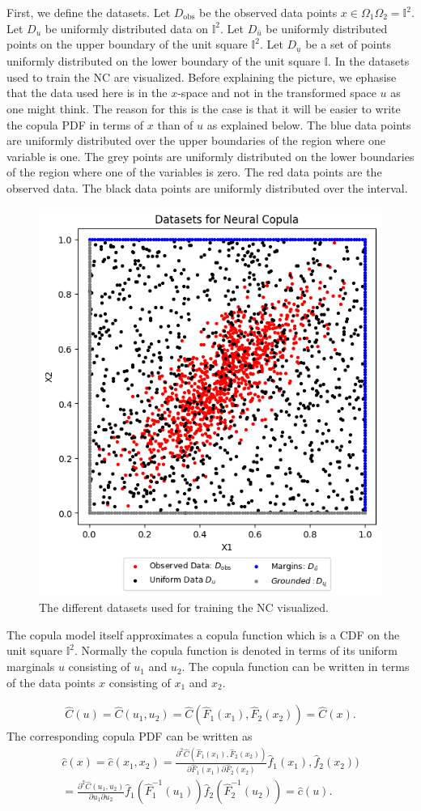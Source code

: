 First, we define the datasets. Let $D_{\mathrm{obs}}$ be the observed data points $x \in \Omega_1\Omega_2  = \mathbb{I}^2$. Let $D_{u}$ be uniformly distributed data on $\mathbb{I}^2$. Let $D_{\bar{u}}$ be uniformly distributed points on the upper boundary of the unit square $\mathbb{I}^2$. Let $D_{\underline{u}}$ be a set of points uniformly distributed on the lower boundary of the unit square $\mathbb{I}$. In  the datasets used to train the \gls{NC} are visualized. Before explaining the picture, we ephasise that the data used here is in the $x$-space and not in the transformed space $u$ as one might think. The reason for this is the case is that it will be easier to write the copula \gls{PDF} in terms of $x$ than of $u$ as explained below. The blue data points are uniformly distributed over the upper boundaries of the region where one variable is one. The grey points are uniformly distributed on the lower boundaries of the region where one of the variables is zero. The red data points are the observed data. The black data points are uniformly distributed over the interval. 

\begin{figure}
    \centering
    \includegraphics[width=0.5\linewidth]{3Theory/pictures/DatasetsNC.png}
    \caption{The different datasets used for training the \gls{NC} visualized.}
    \label{fig:datasetsNC}
\end{figure}

The copula model itself approximates a copula function which is a \gls{CDF} on the unit square $\mathbb{I}^2$. Normally the copula function is denoted in terms of its uniform marginals $u$ consisting of $u_1$ and $u_2$. The copula function can be written in terms of the data points $x$ consisting of $x_1$ and $x_2$. 


\begin{align*}
    \hat{C}(u) = \hat{C}(u_1,u_2) = \hat{C}(\hat{F}_1(x_1),\hat{F}_2(x_2))= \hat{C}(x).
\end{align*}
The corresponding copula \gls{PDF} can be written as  
\begin{align*}
    \hat{c}(x) = \hat{c}(x_1,x_2) 
    = \frac{\partial^2 \hat{C}(\hat{F}_1(x_1),\hat{F}_2(x_2))}{\partial \hat{F}_1(x_1) \partial \hat{F}_2(x_2)} \hat{f}_1(x_1),\hat{f}_2(x_2))\\
    = \frac{\partial^2 \hat{C}(u_1,u_2)}{\partial u_1 \partial u_2} \hat{f}_1(\hat{F}_1^{-1}(u_1)) \hat{f}_2(\hat{F}_2^{-1}(u_2)) 
    = \hat{c}(u).
\end{align*}


